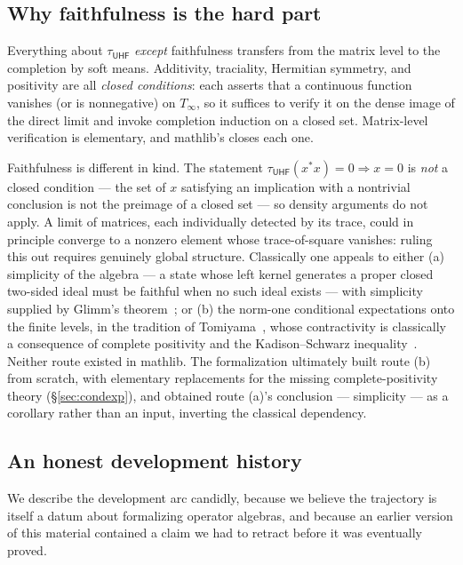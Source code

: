 \documentclass[11pt,a4paper]{amsart}
\theoremstyle{plain}
\theoremstyle{definition}
\newcommand{\lt}[1]{\texttt{\seqsplit{#1}}}
\newcommand{\Tinf}{T_\infty}
\newcommand{\tuhf}{\tau_{\mathsf{UHF}}}
\begin{document}
\subsection{Why faithfulness is the hard part}\label{sec:why-hard}

Everything about $\tuhf$ \emph{except} faithfulness transfers from the
matrix level to the completion by soft means. Additivity, traciality,
Hermitian symmetry, and positivity are all \emph{closed conditions}: each
asserts that a continuous function vanishes (or is nonnegative) on
$\Tinf$, so it suffices to verify it on the dense image of the direct
limit and invoke completion induction on a closed set. Matrix-level
verification is elementary, and mathlib's
\lt{UniformSpace.Completion.induction\_on} closes each one.

Faithfulness is different in kind. The statement
$\tuhf(x^*x) = 0 \Rightarrow x = 0$ is \emph{not} a closed condition ---
the set of $x$ satisfying an implication with a nontrivial conclusion is
not the preimage of a closed set --- so density arguments do not apply. A
limit of matrices, each individually detected by its trace, could in
principle converge to a nonzero element whose trace-of-square vanishes:
ruling this out requires genuinely global structure. Classically one
appeals to either (a) simplicity of the algebra --- a state whose left
kernel generates a proper closed two-sided ideal must be faithful when no
such ideal exists --- with simplicity supplied by Glimm's
theorem~\cite{glimm1960}; or (b) the norm-one conditional expectations
onto the finite levels, in the tradition of
Tomiyama~\cite{tomiyama1957}, whose contractivity is classically a
consequence of complete positivity and the Kadison--Schwarz
inequality~\cite{kadison1952}. Neither route existed in mathlib. The
formalization ultimately built route (b) from scratch, with elementary
replacements for the missing complete-positivity theory
(\S\ref{sec:condexp}), and obtained route (a)'s conclusion --- simplicity
--- as a corollary rather than an input, inverting the classical
dependency.

\subsection{An honest development history}\label{sec:history}

We describe the development arc candidly, because we believe the
trajectory is itself a datum about formalizing operator algebras, and
because an earlier version of this material contained a claim we had to
retract before it was eventually proved.
\end{document}
